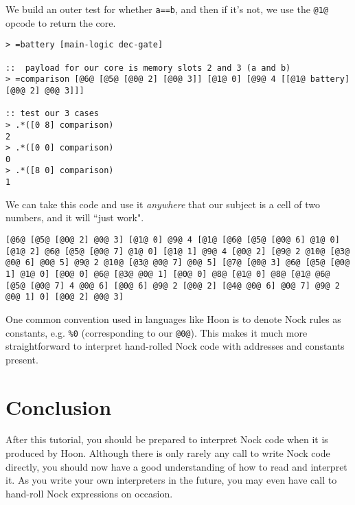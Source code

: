 \documentclass[twoside]{article}
\begin{document}
We build an outer test for whether \lstinline[style=inlinecode]{a==b}, and then if it's not, we use the \lstinline[style=inlinecode]{@1@} opcode to return the core.

\begin{lstlisting}[style=listingblock]
> =battery [main-logic dec-gate]

::  payload for our core is memory slots 2 and 3 (a and b)
> =comparison [@6@ [@5@ [@0@ 2] [@0@ 3]] [@1@ 0] [@9@ 4 [[@1@ battery] [@0@ 2] @0@ 3]]]

:: test our 3 cases
> .*([0 8] comparison)
2
> .*([0 0] comparison)
0
> .*([8 0] comparison)
1
\end{lstlisting}

We can take this code and use it \emph{anywhere} that our subject is a cell of two numbers, and it will ``just work".

\begin{lstlisting}[style=listingblock]
[@6@ [@5@ [@0@ 2] @0@ 3] [@1@ 0] @9@ 4 [@1@ [@6@ [@5@ [@0@ 6] @1@ 0] [@1@ 2] @6@ [@5@ [@0@ 7] @1@ 0] [@1@ 1] @9@ 4 [@0@ 2] [@9@ 2 @10@ [@3@ @0@ 6] @0@ 5] @9@ 2 @10@ [@3@ @0@ 7] @0@ 5] [@7@ [@0@ 3] @6@ [@5@ [@0@ 1] @1@ 0] [@0@ 0] @6@ [@3@ @0@ 1] [@0@ 0] @8@ [@1@ 0] @8@ [@1@ @6@ [@5@ [@0@ 7] 4 @0@ 6] [@0@ 6] @9@ 2 [@0@ 2] [@4@ @0@ 6] @0@ 7] @9@ 2 @0@ 1] 0] [@0@ 2] @0@ 3]
\end{lstlisting}

One common convention used in languages like Hoon is to denote Nock rules as constants, e.g. \@\lstinline[style=inlinecode]{%0} (corresponding to our \lstinline[style=inlinecode]{@0@}).  This makes it much more straightforward to interpret hand-rolled Nock code with addresses and constants present.

\section{Conclusion}

After this tutorial, you should be prepared to interpret Nock code when it is produced by Hoon.  Although there is only rarely any call to write Nock code directly, you should now have a good understanding of how to read and interpret it.  As you write your own interpreters in the future, you may even have call to hand-roll Nock expressions on occasion.

\end{document}
